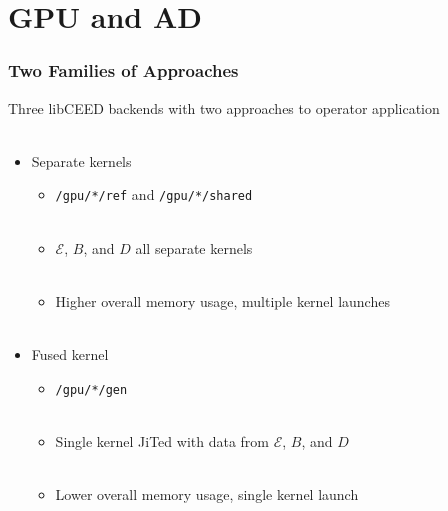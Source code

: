 \documentclass{beamer}
\begin{document}
\section{GPU and AD}

\begin{frame}[fragile]
\begin{center}
\frametitle{Two Families of Approaches}

Three libCEED backends with two approaches to operator application\\

~\\

\begin{itemize}

\item Separate kernels

\begin{itemize}

\item \lstinline{/gpu/*/ref} and \lstinline{/gpu/*/shared}\\

~\\

\item $\mathcal{E}$, {\color{blue(ncs)}$B$}, and {\color{applegreen}$D$} all separate kernels\\

~\\

\item Higher overall memory usage, multiple kernel launches\\

~\\

\end{itemize}

\item Fused kernel

\begin{itemize}

\item \lstinline{/gpu/*/gen}\\

~\\

\item Single kernel JiTed with data from $\mathcal{E}$, {\color{blue(ncs)}$B$}, and {\color{applegreen}$D$}\\

~\\

\item Lower overall memory usage, single kernel launch\\

\end{itemize}

\end{itemize}

\end{center}
\end{frame}
\end{document}
